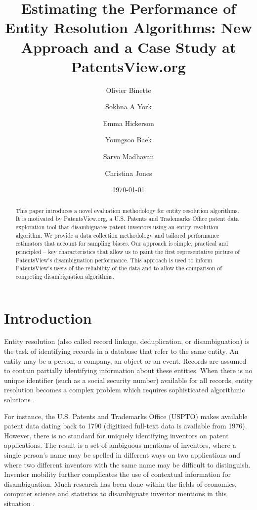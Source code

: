 \documentclass[fontsize=11pt]{article}
\title{Estimating the Performance of Entity Resolution Algorithms: New Approach and a Case Study at PatentsView.org}
\author[1,2]{Olivier Binette}
\author[2]{Sokhna A York}
\author[2]{Emma Hickerson}
\author[1]{Youngsoo Baek}
\author[2]{Sarvo Madhavan}
\author[2]{Christina Jones}
\affil[1]{Duke University}
\affil[2]{American Institutes for Research}
\date{\today}
\newcommand{\ob}[1]{{#1}}
\theoremstyle{definition}
\begin{document}
\maketitle

\begin{abstract}
This paper introduces a novel evaluation methodology for entity resolution algorithms. It is motivated by PatentsView.org, a {U.S. Patents and Trademarks Office patent data exploration tool} that disambiguates patent inventors using an entity resolution algorithm. We provide a data collection methodology and tailored performance estimators that account for sampling biases. Our approach is simple, practical and principled -- key characteristics that allow us to paint the first representative picture of PatentsView's disambiguation performance. This approach is used to inform PatentsView's users of the reliability of the data and to allow the comparison of competing disambiguation algorithms.
\end{abstract}

\section{Introduction}
Entity resolution (also called record linkage, deduplication, or disambiguation) is the task of identifying records in a database that refer to the same entity. An entity may be a person, a company, an object or an event. Records are assumed to contain partially identifying information about these entities. When there is no unique identifier (such as a social security number) available for all records, entity resolution becomes a complex problem which requires sophisticated algorithmic solutions \citep{Herzog2007, Christen2012, Dong2015, Ilyas2019, Christophides2019, Christen2019, Papadakis2021, Binette2022a}. 

For instance, the U.S. Patents and Trademarks Office (USPTO) makes available patent data dating back to 1790 \ob{(digitized full-text data is available from 1976)}. However, there is no standard for uniquely identifying inventors on patent applications. The result is a set of ambiguous mentions of inventors, where a single person's name may be spelled in different ways on two applications and where two different inventors with the same name may be difficult to distinguish. \ob{Inventor mobility further complicates the use of contextual information for disambiguation.} Much research has been done within the fields of economics, computer science and statistics to disambiguate inventor mentions \ob{in this situation} \citep{trajtenberg2008identification, ferreira2012brief, ventura2013methods, Li2014, Ventura2015, kim2016random, yang2017mixture, morrison2017disambiguation, muller2017semantic, traylor2017learning, balsmeier2018machine,tam2019optimal, monath2019scalable, doherr2021disambiguation}.
\end{document}
